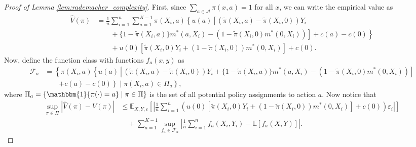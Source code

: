 \documentclass[12pt]{article}
\theoremstyle{definition}
\newcommand{\bbone}{\ensuremath{\mathbbm{1}}}
\newcommand{\E}{\ensuremath{\mathbb{E}}}
\newcommand{\<}{\langle}
\renewcommand{\>}{\rangle}
\newcommand\mcal[1]{\ensuremath{\mathcal{#1}}}
\begin{document}
\begin{proof}[Proof of Lemma \ref{lem:rademacher_complexity}]
  First, since $\sum_{a \in \mathcal{A}} \pi(x, a) = 1$ for all $x$, we can write the empirical value as
  \[
    \begin{aligned}
      \hat{V}(\pi) & = \frac{1}{n}\sum_{i=1}^n\sum_{a =1}^{K-1} \pi(X_i, a)\left\{u(a)\left[\left(\tilde{\pi}(X_i, a) - \tilde{\pi}(X_i, 0) \right)Y_i \right. \right.\\
      & \qquad  + \left. \left.\{1 - \tilde{\pi}(X_i, a)\}m^\ast(a,X_i) - (1 - \tilde{\pi}(X_i, 0) m^\ast(0, X_i))\right] + c(a) - c(0)\right\}\\
      & \qquad + u(0) \left[\tilde{\pi}(X_i, 0) Y_i + (1 - \tilde{\pi}(X_i, 0))m^\ast(0, X_i)\right] + c(0). 
    \end{aligned}
  \]
  Now, define the function class with functions $f_a(x,y)$ as
  \begin{align*}
    \mathcal{F}_a & = \left\{
      \pi(X_i, a)\left\{u(a)\left[\left(\tilde{\pi}(X_i, a) - \tilde{\pi}(X_i, 0) \right)Y_i +
      \{1 - \tilde{\pi}(X_i, a)\}m^\ast(a,X_i) - (1 - \tilde{\pi}(X_i, 0) m^\ast(0, X_i))\right]\right. \right.\\
      & \qquad \left. \left. + c(a) - c(0)\right\}
      \mid \pi(X_i, a) \in \Pi_a
    \right\},
  \end{align*}
  where $\Pi_a = \{\bbone\{\pi(\cdot) = a\} \mid \pi \in \Pi\}$ is the set of 
  all potential policy assignments to action $a$. Now notice that
  \[
  \begin{aligned}
    \sup_{\pi \in \Pi} |\hat{V}(\pi) - V(\pi)| & \leq \E_{X, Y, \varepsilon}\left[\left|\frac{1}{n}\sum_{i=1}^n (u(0) \left[\tilde{\pi}(X_i, 0) Y_i + (1 - \tilde{\pi}(X_i, 0))m^\ast(0, X_i)\right] + c(0)) \varepsilon_i\right|\right]\\
    & \quad  + \sum_{a = 1}^{K-1} \sup_{f_a \in \mcal{F}_a} \left|\frac{1}{n}\sum_{i=1}^n f_a(X_i, Y_i) - \E\left[f_a(X, Y)\right]\right|.
  \end{aligned}
  \]


\end{proof}
\end{document}
